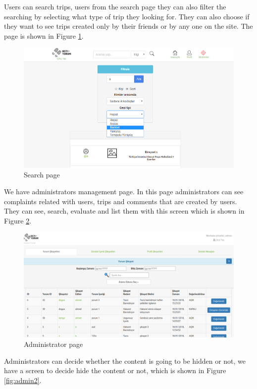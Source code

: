 Users can search trips, users from the search page they can also filter the searching by selecting what type of trip they looking for. They can also choose if they want to see trips   created only by their friends or by any one on the site. The page is shown in Figure   \ref{fig:searchPageWeb}.

\begin{figure}[!htbp]
\centering
\includegraphics[scale= 0.4]{projectChapters/images/searchPageWeb.png}
\caption{Search page}
\label{fig:searchPageWeb}
\end{figure}

\newpage

We have administrators management page. In this page administrators can see complaints related with users, trips and comments that are created by users. They can see, search, evaluate and list them with this screen which is shown in Figure \ref{fig:admin0}.
\begin{figure}[!htbp]
\centering
\includegraphics[width=\textwidth]{projectChapters/images/admin0.png}
\caption{Administrator page}
\label{fig:admin0}
\end{figure}

Administrators can decide whether the content is going to be hidden or not, we have a screen to decide hide the content or not, which is shown in Figure  \ref{fig:admin2}.


